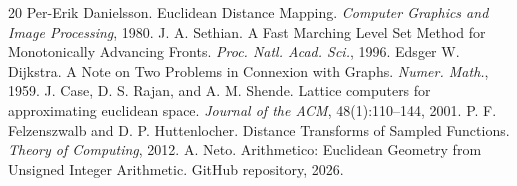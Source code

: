 \documentclass[11pt,a4paper]{article}
\begin{document}
\begin{thebibliography}{20}
 Per-Erik Danielsson. Euclidean Distance Mapping. \textit{Computer Graphics and Image Processing}, 1980.
 J. A. Sethian. A Fast Marching Level Set Method for Monotonically Advancing Fronts. \textit{Proc. Natl. Acad. Sci.}, 1996.
 Edsger W. Dijkstra. A Note on Two Problems in Connexion with Graphs. \textit{Numer. Math.}, 1959.
 J. Case, D. S. Rajan, and A. M. Shende. Lattice computers for approximating euclidean space. \textit{Journal of the ACM}, 48(1):110--144, 2001.
 P. F. Felzenszwalb and D. P. Huttenlocher. Distance Transforms of Sampled Functions. \textit{Theory of Computing}, 2012.
 A. Neto. Arithmetico: Euclidean Geometry from Unsigned Integer Arithmetic. GitHub repository, 2026.
\end{thebibliography}
\end{document}
